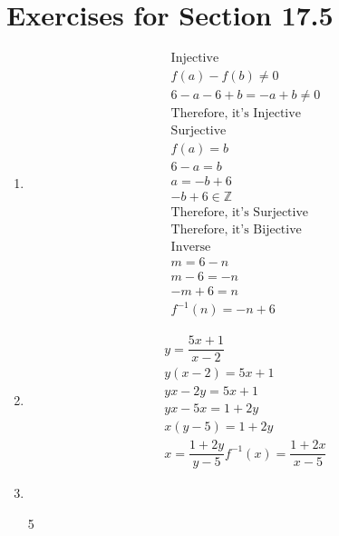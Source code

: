 \documentclass[12pt]{article}
\begin{document}
\section*{Exercises for Section 17.5}
\begin{enumerate}
	\item 
	    \begin{equation*}
	    	\begin{split}
		    \text{Injective}\\
		    f(a) - f(b) \neq 0\\
		    6-a - 6+b = -a+b \neq 0\\
		    \text{Therefore, it's Injective}\\
		    \text{Surjective}\\
		    f(a) = b\\
		    6-a = b\\
		    a = -b+6\\
		    -b+6 \in \mathbb{Z}\\
		    \text{Therefore, it's Surjective}\\
		    \text{Therefore, it's Bijective}\\
		    \text{Inverse}\\
		    m = 6-n\\
		    m-6 = -n\\
		    -m+6 = n\\
		    f^{-1}(n) = -n+6 
	    	\end{split}
	    \end{equation*}
	\item 
	    \begin{equation*}
	    	\begin{split}
		    y = \dfrac{5x+1}{x-2}\\
		    y(x-2) = 5x+1\\
		    yx-2y = 5x+1\\
		    yx-5x = 1+2y\\
		    x(y-5) = 1+2y\\
		    x = \dfrac{1+2y}{y-5}
		    f^{-1}(x) = \dfrac{1+2x}{x-5}
	    	\end{split}
	    \end{equation*}
	\item 
	\item [5]
\end{enumerate}
\end{document}

